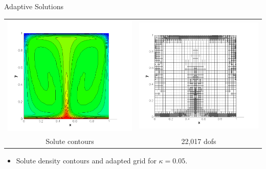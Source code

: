 \documentclass[compress,12pt]{beamer}
\begin{document}
\begin{frame}{Adaptive Solutions}
  {
    \begin{center}
      \begin{tabular}{cc} \\
	\includegraphics[width=.5\textwidth]{figures/s_adapt_kappa_0_05}&
	\includegraphics[width=.5\textwidth]{figures/grid_adapt_kappa_0_05}\\
	Solute contours &
	22,017 dofs
      \end{tabular}\end{center}
    \begin{itemize}
      
    \item Solute density contours and adapted grid for $\kappa=0.05$.
    \end{itemize}
  }


\end{frame}
\end{document}
